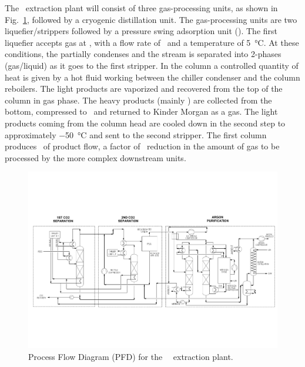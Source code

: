 The \UAr\ extraction plant will consist of three gas-processing units, as shown in Fig.~\ref{fig:Urania-PID}, followed by a cryogenic distillation unit.  The gas-processing units are two  liquefier/strippers followed by a pressure swing adsorption unit (\PSA).   The first liquefier accepts gas at \UraniaGasFeedAvePressure, with a flow rate of \UraniaGasFeedFlow\ and a temperature of \SI{5}{\celsius}.  At these conditions, the  partially condenses and the stream is separated into 2-phases (gas/liquid) as it goes to the first stripper.  In the column a controlled quantity of heat is given by a hot fluid working between the chiller condenser and the column reboilers.  The light products are vaporized and recovered from the top of the column in gas phase.  The heavy products (mainly ) are collected from the bottom, compressed to \UraniaGasReturnPressure\ and returned to Kinder Morgan as a gas. The light products coming from the column head are cooled down in the second step to approximately \SI{-50}{\celsius} and sent to the second stripper.  The first column produces \UraniaFirstUnitOutputFlow\ of product flow, a factor of \UraniaFirstUnitFlowReduction\ reduction in the amount of gas to be processed by the more complex downstream units.  

\begin{figure}[!t]
\centering
\includegraphics[rotate=90, height=\textheight]{./Figures/Urania-PID.pdf}
\caption[Process Flow Diagram for the \Urania\ \UAr\ extraction plant]{Process Flow Diagram (PFD) for the \Urania\ \UAr\ extraction plant.}
\label{fig:Urania-PID}
\end{figure}

